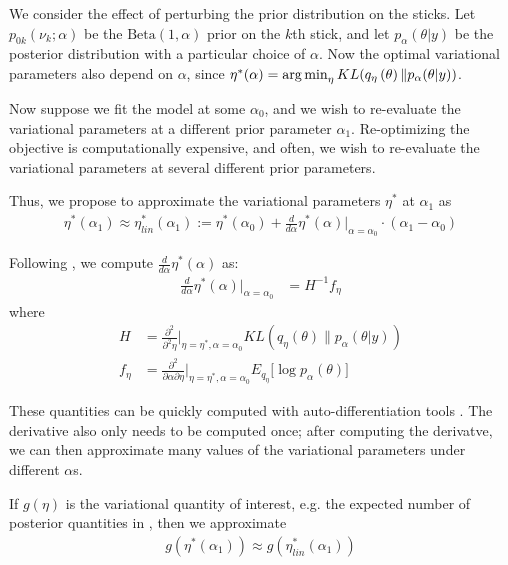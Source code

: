 
We consider the effect of perturbing the prior distribution on the sticks. Let
$p_{0k}(\nu_k; \alpha)$ be the $\text{Beta}(1, \alpha)$ prior on the $k$th
stick, and let $p_{\alpha}(\theta | y)$ be the posterior distribution with a
particular choice of $\alpha$. Now the optimal variational parameters also
depend on $\alpha$, since $\eta^*(\alpha) = \operatorname*{arg\,min}_\eta
KL(q_\eta\left(\theta\right) \| p_{\alpha}(\theta | y))$.

Now suppose we fit the model at some $\alpha_0$, and we wish to re-evaluate the
variational parameters at a different prior parameter $\alpha_1$. Re-optimizing
the objective is computationally expensive, and often, we wish to re-evaluate
the variational parameters at several different prior parameters.

Thus, we propose to approximate the variational parameters $\eta^*$ at
$\alpha_1$ as
%
\begin{align}
    \eta^*(\alpha_1) \approx \eta^*_{lin}(\alpha_1)
    := \eta^*(\alpha_0) +
    \frac{d}{d\alpha}\eta^*(\alpha)\Big|_{\alpha=\alpha_0} \cdot (\alpha_1 - \alpha_0)
    \label{eq:our_approximation}
\end{align}

Following \citet{giordano:2017:covariances},  we compute
$\frac{d}{d\alpha}\eta^*(\alpha) $ as:
%
\begin{align}
  \frac{d}{d\alpha}\eta^*(\alpha)\Big|_{\alpha=\alpha_0} &= H^{-1} f_\eta \label{eq:vb_sensitivty}
\end{align}
%
where
%
\begin{align}
  H &= \frac{\partial^2}{\partial^2\eta}\Big\rvert_{\eta = \eta^*, \alpha = \alpha_0}
  KL(q_\eta\left(\theta\right) \| p_\alpha(\theta | y)) \\
  f_\eta &= \frac{\partial^2}{\partial \alpha \partial \eta}
    \Big\rvert_{\eta = \eta^*, \alpha = \alpha_0} E_{q_{\eta}}
    \big[\log p_\alpha(\theta)\big]
\end{align}

These quantities can be quickly computed with auto-differentiation tools
\citep{maclaurin:2015:autograd}. The derivative also only needs to be computed
once; after computing the derivatve, we can then approximate many values of the
variational parameters under different $\alpha$s.

If $g(\eta)$ is the variational quantity of interest, e.g. the expected number
of posterior quantities in , then we
approximate
%
\begin{align}
    g(\eta^*(\alpha_1)) \approx g(\eta^*_{lin}(\alpha_1))
\end{align}

